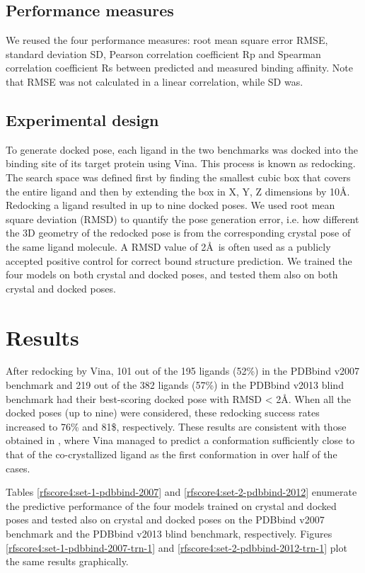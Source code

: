 \subsection{Performance measures}

We reused the four performance measures: root mean square error RMSE, standard deviation SD, Pearson correlation coefficient Rp and Spearman correlation coefficient Rs between predicted and measured binding affinity. Note that RMSE was not calculated in a linear correlation, while SD was.

\subsection{Experimental design}

To generate docked pose, each ligand in the two benchmarks was docked into the binding site of its target protein using Vina. This process is known as redocking. The search space was defined first by finding the smallest cubic box that covers the entire ligand and then by extending the box in X, Y, Z dimensions by 10\AA \citep{1362}. Redocking a ligand resulted in up to nine docked poses. We used root mean square deviation (RMSD) to quantify the pose generation error, i.e. how different the 3D geometry of the redocked pose is from the corresponding crystal pose of the same ligand molecule. A RMSD value of 2\AA\ is often used as a publicly accepted positive control for correct bound structure prediction. We trained the four models on both crystal and docked poses, and tested them also on both crystal and docked poses.

\section{Results}

After redocking by Vina, 101 out of the 195 ligands (52\%) in the PDBbind v2007 benchmark and 219 out of the 382 ligands (57\%) in the PDBbind v2013 blind benchmark had their best-scoring docked pose with RMSD < 2\AA. When all the docked poses (up to nine) were considered, these redocking success rates increased to 76\% and 81\$, respectively. These results are consistent with those obtained in \citep{1362}, where Vina managed to predict a conformation sufficiently close to that of the co-crystallized ligand as the first conformation in over half of the cases.

Tables \ref{rfscore4:set-1-pdbbind-2007} and \ref{rfscore4:set-2-pdbbind-2012} enumerate the predictive performance of the four models trained on crystal and docked poses and tested also on crystal and docked poses on the PDBbind v2007 benchmark and the PDBbind v2013 blind benchmark, respectively. Figures \ref{rfscore4:set-1-pdbbind-2007-trn-1} and \ref{rfscore4:set-2-pdbbind-2012-trn-1} plot the same results graphically.

